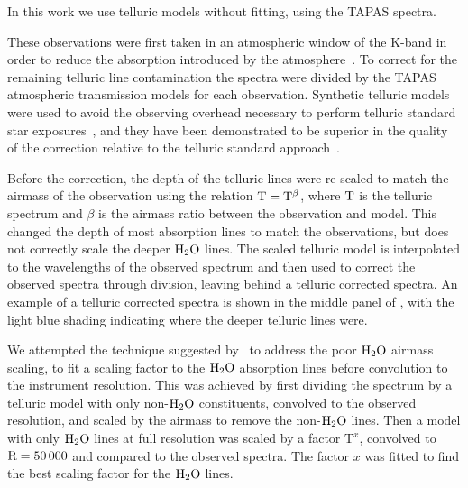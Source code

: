 In this work we use telluric models without fitting, using the TAPAS spectra.

These observations were first taken in an atmospheric window of the K-band in order to reduce the absorption introduced by the atmosphere~\citep{barnes_hd_2008}. 
 To correct for the remaining telluric line contamination the spectra were divided by the TAPAS\citep{bertaux_tapas_2014} atmospheric transmission models for each observation. Synthetic telluric models were used to avoid the observing overhead necessary to perform telluric standard star exposures~\citep{vacca_method_2003}, and they have been demonstrated to be superior in the quality of the correction relative to the telluric standard approach~\citep[e.g.][]{cotton_atmospheric_2014}.

Before the correction, the depth of the telluric lines were re-scaled to match the airmass of the observation using the relation \(\rm T = T^{\beta} \), where \(\rm T\) is the telluric spectrum and \(\beta \) is the airmass ratio between the observation and model. This changed the depth of most absorption lines to match the observations, but does not correctly scale the deeper \(\rm H_{2}O \) lines. The scaled telluric model is interpolated to the wavelengths of the observed spectrum and then used to correct the observed spectra through division, leaving behind a telluric corrected spectra. An example of a telluric corrected spectra is shown in the middle panel of , with the light blue shading indicating where the deeper telluric lines were.

We attempted the technique suggested by~\citet{bertaux_tapas_2014} to address the poor \(\rm H_{2}O \) airmass scaling, to fit a scaling factor to the \(\rm {H}_{2}O \) absorption lines before convolution to the instrument resolution. This was achieved by first dividing the spectrum by a telluric model with only non-\(\rm H_{2}O \) constituents, convolved to the observed resolution, and scaled by the airmass to remove the non-\(\rm H_{2}O \) lines. Then a model with only \(\rm H_{2}O \) lines at full resolution was scaled by a factor \(\textrm{T}^{x} \), convolved to \(\rm R=50\,000 \) and compared to the observed spectra. The factor \(x \) was fitted to find the best scaling factor for the \(\rm H_{2}O \) lines.

